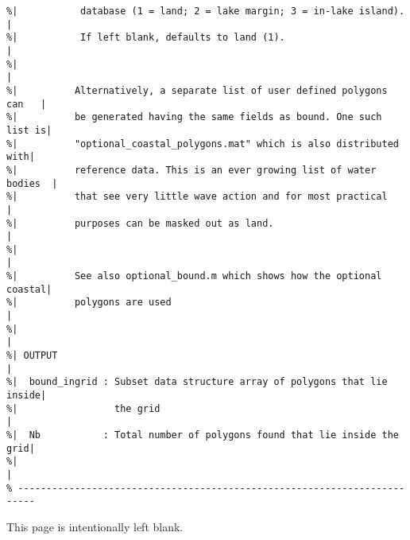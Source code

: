 \documentclass[12pt]{article}
\newcommand{\pb}{\strut \vfill \pagebreak}
\newcommand{\bpagea}{\strut

\vspace{2.5in} \centerline{This page is intentionally left blank.}}
\begin{document}
\begin{verbatim}
%|           database (1 = land; 2 = lake margin; 3 = in-lake island).    |
%|           If left blank, defaults to land (1).                         |
%|                                                                        |
%|          Alternatively, a separate list of user defined polygons can   |
%|          be generated having the same fields as bound. One such list is|
%|          "optional_coastal_polygons.mat" which is also distributed with|
%|          reference data. This is an ever growing list of water bodies  |
%|          that see very little wave action and for most practical       | 
%|          purposes can be masked out as land.                           |
%|                                                                        | 
%|          See also optional_bound.m which shows how the optional coastal|
%|          polygons are used                                             |
%|                                                                        |
%| OUTPUT                                                                 |
%|  bound_ingrid : Subset data structure array of polygons that lie inside|
%|                 the grid                                               |
%|  Nb           : Total number of polygons found that lie inside the grid|
%|                                                                        |
% -------------------------------------------------------------------------
\end{verbatim} 

\bpagea
\pb
\end{document}
